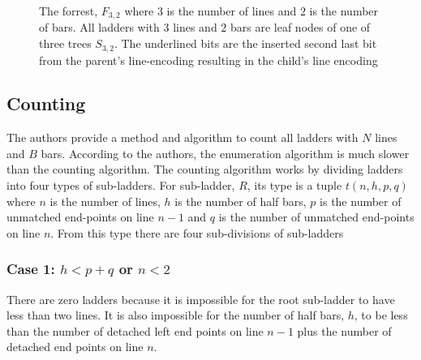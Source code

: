 \begin{figure}[!htp]
\begin{flushleft}
\begin{minipage}{0.8\textwidth}
        \end{minipage}
    \end{flushleft}
    \caption{The forrest, $F_{3,2}$ where $3$ is the number of lines and $2$ is the number of bars. All ladders with $3$ lines and $2$ bars are leaf nodes of one of three trees $S_{3,2}$.
    The underlined bits are the inserted second last bit from the parent's line-encoding resulting in the child's line encoding}
\end{figure}


\subsection{Counting}
The authors provide a method and algorithm to count all ladders 
with $N$ lines and $B$ bars. According to the authors, the enumeration algorithm is 
much slower than the counting algorithm. The counting algorithm 
works by dividing ladders into four types of sub-ladders.
For sub-ladder, $R$, its type is a tuple $t(n,h,p,q)$ where 
$n$ is the number of lines, $h$ is the number of half bars, 
$p$ is the number of unmatched end-points on line $n-1$ and 
$q$ is the number of unmatched end-points on line $n$. From this 
type there are four sub-divisions of sub-ladders
\subsubsection{Case 1: $h < p+q$ or $n<2$}
There are zero ladders because it is impossible for the 
root sub-ladder to have less than two lines. It is also 
impossible for the number of half bars, $h$, to 
be less than the number of detached left end points 
on line $n-1$ plus the number of detached end points on 
line $n$.


